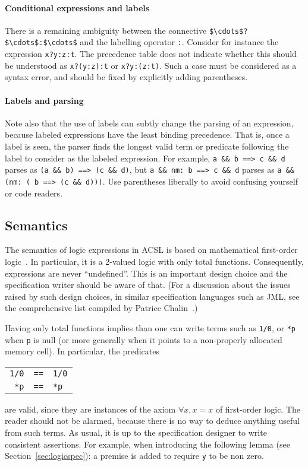 \paragraph{Conditional expressions and labels}
There is a remaining ambiguity between the connective
\lstinline|$\cdots$?$\cdots$:$\cdots$| and the labelling operator
\lstinline|:|. Consider for instance the
expression \lstinline|x?y:z:t|. The precedence table does not indicate
whether this should be understood as \lstinline|x?(y:z):t| or
\lstinline|x?y:(z:t)|.
Such a case must be considered as a syntax error, and should be fixed
by explicitly adding parentheses.

\paragraph{Labels and parsing}
Note also that the use of labels can subtly change the parsing of an
expression, because labeled expressions have the least binding precedence.
That is, once a label is seen, the parser finds the longest valid term or
predicate following the label to consider as the labeled expression.
For example, \lstinline|a && b ==> c && d| parses as 
\lstinline|(a && b) ==> (c && d)|, but
\lstinline|a && nm: b ==> c && d| parses as
\lstinline|a && (nm: ( b ==> (c && d)))|.
Use parentheses liberally to avoid confusing yourself or code readers.

\subsection{Semantics}
\label{sec:twovaluedlogic}

The semantics of logic expressions in ACSL is based on
mathematical first-order
logic~\cite{wikipedia-fo-logic}. In
particular, it is a 2-valued logic with only total functions. Consequently,
expressions are never ``undefined''.
This is an important design choice and the specification writer should
be aware of that. (For a discussion about the issues raised by such
design choices, in similar specification languages such as JML, see
the comprehensive list compiled by Patrice
Chalin~\cite{chalin05ftfjp,chalin07icse}.)

Having only total functions implies than one can write
terms such as \lstinline|1/0|, or \lstinline|*p| when \lstinline!p! is
null (or more
generally
when it points to a non-properly allocated memory cell). In
particular, the predicates
\begin{tabular}{rcl}
  \lstinline!1/0! &\lstinline|==|& \lstinline!1/0! \\\relax
  \lstinline!*p! &\lstinline|==|& \lstinline!*p!
\end{tabular}
are valid, since they are instances of the axiom $\forall x,
x=x$ of first-order logic. The reader should not be alarmed, because
there is no way to deduce anything useful from such terms.
As usual, it is up to the specification designer to write
consistent assertions. For example, when introducing the following lemma
(see Section~\ref{sec:logicspec}):
a premise is added to require \lstinline|y| to be non zero.


